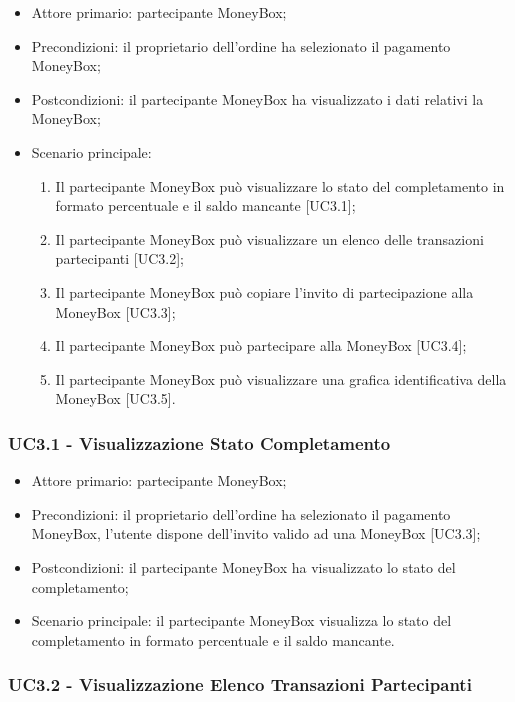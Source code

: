 \begin{itemize}
    \item Attore primario: partecipante MoneyBox\glo{};
    \item Precondizioni: il proprietario dell'ordine ha selezionato il pagamento MoneyBox\glo [UC2.2.2];
    \item Postcondizioni: il partecipante MoneyBox\glo{} ha visualizzato i dati relativi la MoneyBox\glo{};
    \item Scenario principale:
        \begin{enumerate}
            \item Il partecipante MoneyBox\glo{} può visualizzare lo stato del completamento in formato percentuale e il saldo mancante [UC3.1];
            \item Il partecipante MoneyBox\glo{} può visualizzare un elenco delle transazioni partecipanti [UC3.2];
            \item Il partecipante MoneyBox\glo{} può copiare l'invito di partecipazione alla MoneyBox\glo{} [UC3.3];
            \item Il partecipante MoneyBox\glo{} può partecipare alla MoneyBox\glo{} [UC3.4];
            \item Il partecipante MoneyBox\glo{} può visualizzare una grafica identificativa della MoneyBox\glo{} [UC3.5].
    \end{enumerate}
\end{itemize}

\subsubsection{UC3.1 - Visualizzazione Stato Completamento}

\begin{itemize}
    \item Attore primario: partecipante MoneyBox\glo{};
    \item Precondizioni: il proprietario dell'ordine ha selezionato il pagamento MoneyBox\glo [UC2.2.2], 
            l'utente dispone dell'invito valido ad una MoneyBox\glo{} [UC3.3];
    \item Postcondizioni: il partecipante MoneyBox\glo{} ha visualizzato lo stato del completamento;
    \item Scenario principale: il partecipante MoneyBox\glo{} visualizza lo stato del completamento in formato percentuale e il saldo mancante.
\end{itemize}

\subsubsection{UC3.2 - Visualizzazione Elenco Transazioni Partecipanti}

